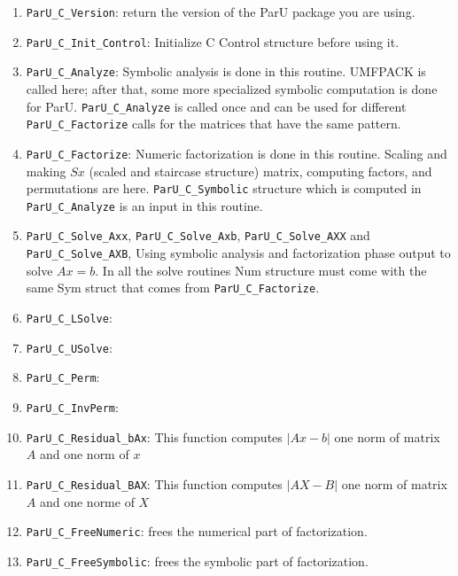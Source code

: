 \documentclass[12pt]{article}
\begin{document}
\begin{enumerate}

    \item \verb'ParU_C_Version': return the version of the ParU package
        you are using.

    \item \verb'ParU_C_Init_Control': Initialize C Control structure before using
        it.

    \item \verb'ParU_C_Analyze': Symbolic analysis is done in this routine.
        UMFPACK is called here; after that, some more specialized symbolic
        computation is done for ParU.
        \verb'ParU_C_Analyze' is called once and can be used for different
        \verb'ParU_C_Factorize' calls for the matrices that have the same pattern.
    \item \verb'ParU_C_Factorize':
        Numeric factorization is done in this routine. Scaling and
        making $Sx$ (scaled and staircase structure) matrix, computing factors,
        and permutations are here. \verb'ParU_C_Symbolic' structure which is
        computed in \verb'ParU_C_Analyze' is an input in this routine.

    \item \verb'ParU_C_Solve_Axx',  \verb'ParU_C_Solve_Axb',
        \verb'ParU_C_Solve_AXX' and \verb'ParU_C_Solve_AXB',
        Using symbolic analysis and factorization phase output to solve $Ax=b$.
        In all the solve routines Num structure must come with the same
        Sym struct that comes from \verb'ParU_C_Factorize'.

    \item \verb'ParU_C_LSolve':       %
    \item \verb'ParU_C_USolve':       %
    \item \verb'ParU_C_Perm':         %
    \item \verb'ParU_C_InvPerm':      %

    \item \verb'ParU_C_Residual_bAx':
        This function computes $|Ax-b|$ one norm of matrix $A$ and one norm of
        $x$

    \item \verb'ParU_C_Residual_BAX':
        This function computes $|AX-B|$ one norm of matrix $A$ and one norme of
        $X$


    \item \verb'ParU_C_FreeNumeric':  frees the numerical part of factorization.


    \item \verb'ParU_C_FreeSymbolic':  frees the symbolic part of factorization.

\end{enumerate}
\end{document}
